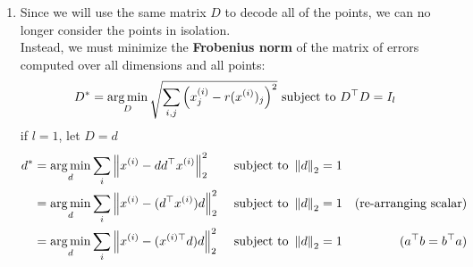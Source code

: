 \begin{enumerate}
\begin{enumerate}
        \item  Since we will use the same matrix $D$ to decode all of the points, we can no longer consider the points in isolation.\\
        Instead, we must minimize the \textbf{Frobenius norm} of the matrix of errors computed over all dimensions and all points:
        \[
        D^\ast
        = \mathop{\arg\min}_D 
            \sqrt{\displaystyle\sum_{i,j} \left(x_j^{(i)} - r(x^{(i)})_j\right)^2}
            \text{ subject to }
            D^\top D = I_l
        \]
        if $l=1$, let $D=d$\\
        \[
        \begin{aligned}
        d^\ast
        &= \mathop{\arg\min}_d 
            \displaystyle\sum_{i} \left\| x^{(i)} - dd^\top x^{(i)} \right\|_2^2
            &\text{ subject to }
            \left\| d \right\|_2 = 1 \\
        &= \mathop{\arg\min}_d 
            \displaystyle\sum_{i} \left\| x^{(i)} - (d^\top x^{(i)})d \right\|_2^2
            &\text{ subject to }
            \left\| d \right\|_2 = 1 && \text{(re-arranging scalar)} \\
        &= \mathop{\arg\min}_d 
            \displaystyle\sum_{i} \left\| x^{(i)} - (x^{(i)\top} d)d \right\|_2^2
            &\text{ subject to }
            \left\| d \right\|_2 = 1 && {(a^\top b = b^\top a)} \\
        \end{aligned}
        \]


\end{enumerate}
\end{enumerate}

